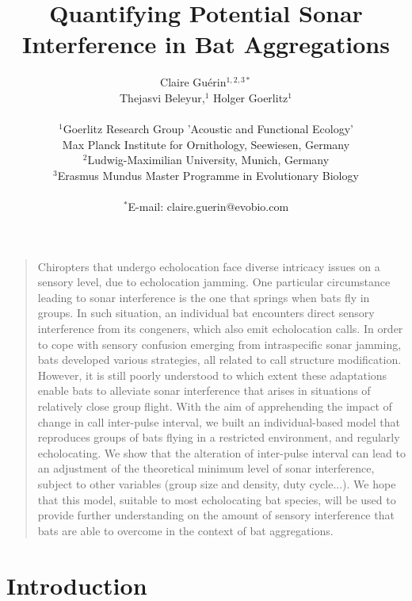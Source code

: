 \documentclass[12pt]{article}
\title{Quantifying Potential Sonar Interference in Bat Aggregations}
\author
{Claire Gu\'{e}rin$^{1,2,3\ast}$\\ Thejasvi Beleyur,$^{1}$ Holger Goerlitz$^{1}$\\
\\
\normalsize{$^{1}$Goerlitz Research Group 'Acoustic and Functional Ecology'}\\
\normalsize{Max Planck Institute for Ornithology, Seewiesen, Germany}\\
\normalsize{$^{2}$Ludwig-Maximilian University, Munich, Germany}\\
\normalsize{$^{3}$Erasmus Mundus Master Programme in Evolutionary Biology}\\
\\
\normalsize{$^\ast$E-mail:  claire.guerin@evobio.com}
}
\date{}
\newenvironment{sciabstract}{%
\begin{quote} \bf}
{\end{quote}}
\begin{document}
\singlespacing

\maketitle

\begin{sciabstract} 

Chiropters that undergo echolocation face diverse intricacy issues on a sensory level, due to echolocation jamming. One particular circumstance leading to sonar interference is the one that springs when bats fly in groups. In such situation, an individual bat encounters direct sensory interference from its congeners, which also emit echolocation calls. In order to cope with sensory confusion emerging from intraspecific sonar jamming, bats developed various strategies, all related to call structure modification. However, it is still poorly understood to which extent these adaptations enable bats to alleviate sonar interference that arises in situations of relatively close group flight. With the aim of apprehending the impact of change in call inter-pulse interval, we built an individual-based model that reproduces groups of bats flying in a restricted environment, and regularly echolocating. We show that the alteration of inter-pulse interval can lead to an adjustment of the theoretical minimum level of sonar interference, subject to other variables (group size and density, duty cycle...). We hope that this model, suitable to most echolocating bat species, will be used to provide further understanding on the amount of sensory interference that bats are able to overcome in the context of bat aggregations.

\end{sciabstract}

\doublespacing

\section{Introduction}
\end{document}
